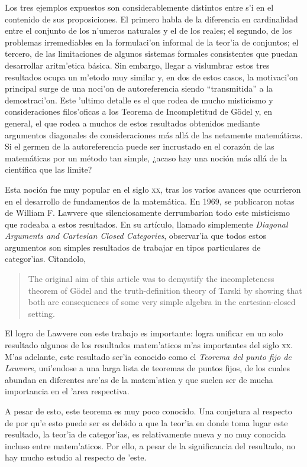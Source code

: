 Los tres ejemplos expuestos son considerablemente distintos entre s'i en el contenido de sus proposiciones. El primero habla de la diferencia en cardinalidad entre el conjunto de los n'umeros naturales y el de los reales; el segundo, de los problemas irremediables en la formulaci'on informal de la teor'ia de conjuntos; el tercero, de las limitaciones de algunos sistemas formales consistentes que puedan desarrollar aritm'etica básica. Sin embargo, llegar a vislumbrar estos tres resultados ocupa un m'etodo muy similar y, en dos de estos casos, la motivaci'on principal surge de una noci'on de autoreferencia siendo \enquote{transmitida} a la demostraci'on. Este 'ultimo detalle es el que rodea de mucho misticismo y consideraciones filos'oficas a los Teorema de Incompletitud de Gödel y, en general, el que rodea a muchos de estos resultados obtenidos mediante argumentos diagonales de consideraciones más allá de las netamente matemáticas. Si el germen de la autoreferencia puede ser incrustado en el corazón de las matemáticas por un método tan simple, ¿acaso hay una noción más allá de la científica que las limite? 

Esta noción fue muy popular en el siglo \textsc{xx}, tras los varios avances que ocurrieron en el desarrollo de fundamentos de la matemática. En 1969, se publicaron notas de William F. Lawvere que silenciosamente derrumbarían todo este misticismo que rodeaba a estos resultados. En su artículo, llamado simplemente \emph{Diagonal Arguments and Cartesian Closed Categories}, observar'ia que todos estos argumentos son simples resultados de trabajar en tipos particulares de categor'ias. Citandolo, 

\begin{quote}
    The original aim of this article was to demystify the incompleteness theorem of Gödel and the truth-definition theory of Tarski by showing that both are consequences of some very simple algebra in the cartesian-closed setting.
\end{quote}

El logro de Lawvere con este trabajo es importante: logra unificar en un solo resultado algunos de los resultados matem'aticos m'as importantes del siglo \textsc{xx}. M'as adelante, este resultado ser'ia conocido como el \emph{Teorema del punto fijo de Lawvere}, uni'endose a una larga lista de teoremas de puntos fijos, de los cuales abundan en diferentes are'as de la matem'atica y que suelen ser de mucha importancia en el 'area respectiva. 

A pesar de esto, este teorema es muy poco conocido. Una conjetura al respecto de por qu'e esto puede ser es debido a que la teor'ia en donde toma lugar este resultado, la teor'ia de categor'ias, es relativamente nueva y no muy conocida incluso entre matem'aticos. Por ello, a pesar de la significancia del resultado, no hay mucho estudio al respecto de 'este. 

